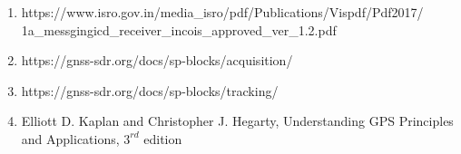 \begin{enumerate}

	\item https://www.isro.gov.in/media\_isro/pdf/Publications/Vispdf/Pdf2017/\\1a\_messgingicd\_receiver\_incois\_approved\_ver\_1.2.pdf

	\item https://gnss-sdr.org/docs/sp-blocks/acquisition/

	\item https://gnss-sdr.org/docs/sp-blocks/tracking/
   
	\item Elliott D. Kaplan and Christopher J. Hegarty,  Understanding {GPS} {P}rinciples and {A}pplications, $3^{rd}$ edition
\end{enumerate}

